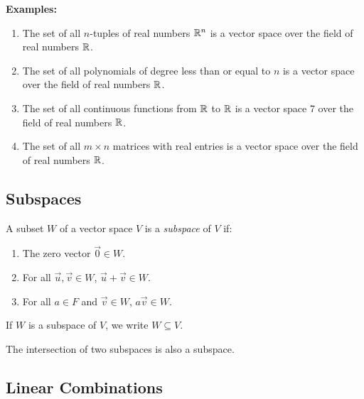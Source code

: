 \textbf{Examples:}

\begin{enumerate}

	\item The set of all \(n\)-tuples of real numbers \(\mathbb{R}^n\) is a vector space over the field 
	      of real numbers \(\mathbb{R}\).

	\item The set of all polynomials of degree less than or equal to \(n\) is a vector space over the 
	      field of real numbers \(\mathbb{R}\).

	\item The set of all continuous functions from \(\mathbb{R}\) to \(\mathbb{R}\) is a vector space 7
	      over the field of real numbers \(\mathbb{R}\).

	\item The set of all \(m \times n\) matrices with real entries is a vector space over the field of 
	      real numbers \(\mathbb{R}\).

\end{enumerate}

\subsection{Subspaces}

A subset \(W\) of a vector space \(V\) is a \emph{subspace} of \(V\) if:

\begin{enumerate}[label=\Roman*.]

	\item The zero vector \(\vec{0} \in W\).

	\item For all \(\vec{u}, \vec{v} \in W\), \(\vec{u} + \vec{v} \in W\).

	\item For all \(a \in F\) and \(\vec{v} \in W\), \(a\vec{v} \in W\).

\end{enumerate}

If \(W\) is a subspace of \(V\), we write \(W \subseteq V\).
\vspace{\baselineskip}

The intersection of two subspaces is also a subspace.

\subsection{Linear Combinations}

